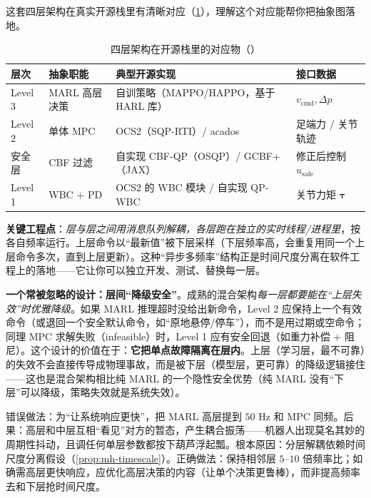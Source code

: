 这套四层架构在真实开源栈里有清晰对应（\cref{tab:mh-impl}），理解这个对应能帮你把抽象图落地。

\begin{table}[H]\centering\small
\caption{四层架构在开源栈里的对应物（）}
\label{tab:mh-impl}
\begin{tabular}{p{1.8cm}p{2.6cm}p{4.2cm}p{3.2cm}}
\toprule
层次 & 抽象职能 & 典型开源实现 & 接口数据 \\
\midrule
Level 3 & MARL 高层决策 & 自训策略（MAPPO/HAPPO，基于 HARL 库） & $v_{\text{cmd}},\Delta p$ \\
Level 2 & 单体 MPC & OCS2（SQP-RTI）/ acados & 足端力 / 关节轨迹 \\
安全层 & CBF 过滤 & 自实现 CBF-QP（OSQP）/ GCBF+（JAX） & 修正后控制 $u_{\text{safe}}$ \\
Level 1 & WBC $+$ PD & OCS2 的 WBC 模块 / 自实现 QP-WBC & 关节力矩 $\boldsymbol\tau$ \\
\bottomrule
\end{tabular}
\end{table}

\noindent\textbf{关键工程点}：\emph{层与层之间用消息队列解耦，各层跑在独立的实时线程/进程里}，按各自频率运行。上层命令以“最新值”被下层采样（下层频率高，会重复用同一个上层命令多次，直到上层更新）。这种“异步多频率”结构正是时间尺度分离在软件工程上的落地——它让你可以独立开发、测试、替换每一层。

\textbf{一个常被忽略的设计：层间“降级安全”}。成熟的混合架构\emph{每一层都要能在“上层失效”时优雅降级}。如果 MARL 推理超时没给出新命令，Level 2 应保持上一个有效命令（或退回一个安全默认命令，如“原地悬停/停车”），而不是用过期或空命令；同理 MPC 求解失败（infeasible）时，Level 1 应有安全回退（如重力补偿 $+$ 阻尼）。这个设计的价值在于：\textbf{它把单点故障隔离在层内}。上层（学习层，最不可靠）的失效不会直接传导成物理事故，而是被下层（模型层，更可靠）的降级逻辑接住——这也是混合架构相比纯 MARL 的一个隐性安全优势（纯 MARL 没有“下层”可以降级，策略失效就是系统失效）。

\begin{pitfall}
错误做法：为“让系统响应更快”，把 MARL 高层提到 $50$ Hz 和 MPC 同频。后果：高层和中层互相“看见”对方的暂态，产生耦合振荡——机器人出现莫名其妙的周期性抖动，且调任何单层参数都按下葫芦浮起瓢。根本原因：分层解耦依赖时间尺度分离假设（\cref{prop:mh-timescale}）。正确做法：保持相邻层 $5$--$10$ 倍频率比；如确需高层更快响应，应优化高层决策的内容（让单个决策更鲁棒），而非提高频率去和下层抢时间尺度。
\end{pitfall}

